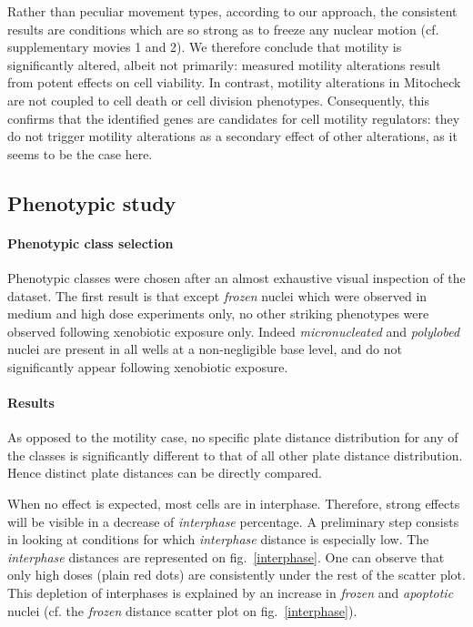 Rather than peculiar movement types, according to our approach, the
consistent results are conditions which are so strong as to freeze any
nuclear motion (cf. supplementary movies 1 and 2). We therefore
conclude that motility is significantly altered, albeit not primarily:
measured motility alterations result from potent effects on cell
viability. In contrast, motility alterations in Mitocheck are not coupled to cell
death or cell division phenotypes. Consequently, this confirms that
the identified genes are candidates for cell motility regulators: they do not
trigger motility alterations as a secondary effect of other
alterations, as it seems to be the case here. 

\subsection{Phenotypic study}
\paragraph{Phenotypic class selection}
Phenotypic classes were chosen after an almost exhaustive visual
inspection of the dataset. The first result is that except
\textit{frozen} nuclei which were observed in medium and high dose
experiments only, no other striking phenotypes were observed following
xenobiotic exposure only. Indeed \textit{micronucleated} and
\textit{polylobed} nuclei are present in all wells at a non-negligible
base level, and do not significantly appear following xenobiotic
exposure. 

\paragraph{Results}
As opposed to the motility case, no specific plate distance distribution for any of the classes is significantly different to that of all other plate distance distribution. Hence distinct plate distances can be directly compared. 

When no effect is expected, most cells are in interphase. Therefore, strong effects will be visible in a decrease of \textit{interphase} percentage. A preliminary step consists in looking at conditions for which \textit{interphase} distance is especially low. The \textit{interphase} distances are represented on fig.~\ref{interphase}. One can observe that only high doses (plain red dots) are consistently under the rest of the scatter plot. This depletion of interphases is explained by an increase in \textit{frozen} and \textit{apoptotic} nuclei (cf. the \textit{frozen} distance scatter plot on fig.~\ref{interphase}).

